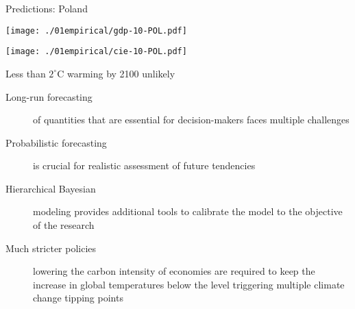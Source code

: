 \documentclass[notes,blackandwhite,mathsans,usenames,dvipsnames]{beamer}
\begin{document}
\begin{frame}{Predictions: Poland}

\begin{center}
\texttt{[image: ./01empirical/gdp-10-POL.pdf]}

\texttt{[image: ./01empirical/cie-10-POL.pdf]}
\end{center}
\end{frame}


{
\begin{frame}{\color{blu}Less than $2^{\circ}$C warming by 2100 unlikely}

\begin{description}
\item[\color{blu}Long-run forecasting] {\color{yel}of quantities that are essential for decision-makers faces multiple challenges} 

\bigskip\item[\color{blu}Probabilistic forecasting] {\color{yel}is crucial for realistic assessment of future tendencies } 

\bigskip\item[\color{blu}Hierarchical Bayesian] {\color{yel} modeling provides additional tools to calibrate the model to the objective of the research} 

\bigskip\item[\color{blu}Much stricter policies] {\color{yel}lowering the carbon intensity of economies are required to keep the increase in global temperatures below the level triggering multiple climate change tipping points}

\end{description}

\end{frame}}
\end{document}
